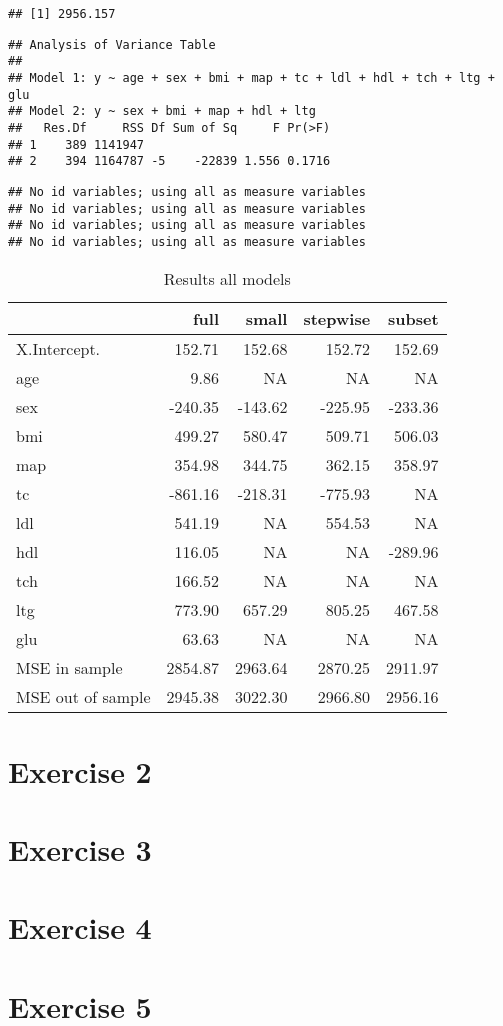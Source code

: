 \documentclass[
]{article}
\begin{document}
\begin{verbatim}
## [1] 2956.157
\end{verbatim}

\begin{verbatim}
## Analysis of Variance Table
## 
## Model 1: y ~ age + sex + bmi + map + tc + ldl + hdl + tch + ltg + glu
## Model 2: y ~ sex + bmi + map + hdl + ltg
##   Res.Df     RSS Df Sum of Sq     F Pr(>F)
## 1    389 1141947                          
## 2    394 1164787 -5    -22839 1.556 0.1716
\end{verbatim}

\begin{verbatim}
## No id variables; using all as measure variables
## No id variables; using all as measure variables
## No id variables; using all as measure variables
## No id variables; using all as measure variables
\end{verbatim}

\begin{table}

\caption{\label{tab:Exercise 1 summary}Results all models}
\centering
\begin{tabular}[t]{l|r|r|r|r}
\hline
  & full & small & stepwise & subset\\
\hline
X.Intercept. & 152.71 & 152.68 & 152.72 & 152.69\\
\hline
age & 9.86 & NA & NA & NA\\
\hline
sex & -240.35 & -143.62 & -225.95 & -233.36\\
\hline
bmi & 499.27 & 580.47 & 509.71 & 506.03\\
\hline
map & 354.98 & 344.75 & 362.15 & 358.97\\
\hline
tc & -861.16 & -218.31 & -775.93 & NA\\
\hline
ldl & 541.19 & NA & 554.53 & NA\\
\hline
hdl & 116.05 & NA & NA & -289.96\\
\hline
tch & 166.52 & NA & NA & NA\\
\hline
ltg & 773.90 & 657.29 & 805.25 & 467.58\\
\hline
glu & 63.63 & NA & NA & NA\\
\hline
MSE in sample & 2854.87 & 2963.64 & 2870.25 & 2911.97\\
\hline
MSE out of sample & 2945.38 & 3022.30 & 2966.80 & 2956.16\\
\hline
\end{tabular}
\end{table}

\hypertarget{exercise-2}{%
\section{Exercise 2}\label{exercise-2}}

\hypertarget{exercise-3}{%
\section{Exercise 3}\label{exercise-3}}

\hypertarget{exercise-4}{%
\section{Exercise 4}\label{exercise-4}}

\hypertarget{exercise-5}{%
\section{Exercise 5}\label{exercise-5}}
\end{document}
